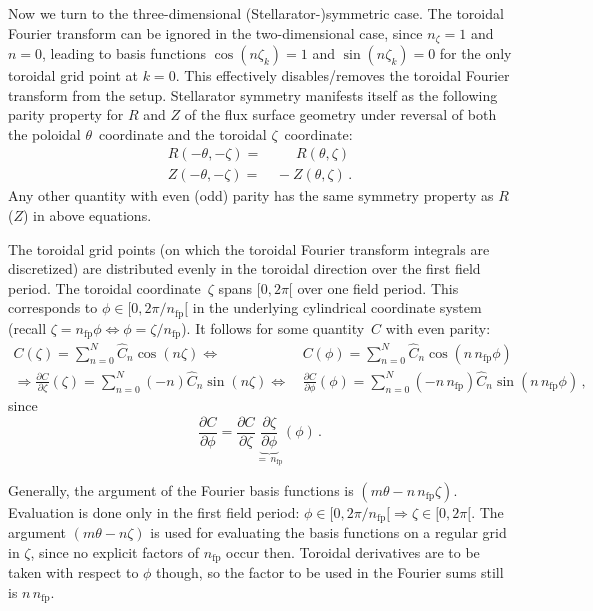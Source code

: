 \FloatBarrier
Now we turn to the three-dimensional (Stellarator-)symmetric case.
The toroidal Fourier transform can be ignored in the two-dimensional case, since $n_\zeta=1$ and $n=0$,
leading to basis functions $\cos(n\zeta_k)=1$ and $\sin(n\zeta_k)=0$ for the only toroidal grid point at $k=0$.
This effectively disables/removes the toroidal Fourier transform from the setup.
Stellarator symmetry manifests itself as the following parity property
for $R$ and $Z$ of the flux surface geometry under reversal
of both the poloidal $\theta$~coordinate and the toroidal $\zeta$~coordinate:
\begin{align}
  R(-\theta, -\zeta) =&\, \phantom{-}~ R(\theta, \zeta) \\
  Z(-\theta, -\zeta) =&\,          -   Z(\theta, \zeta) \, .
\end{align}
Any other quantity with even (odd) parity has the same symmetry property as $R$ ($Z$) in above equations.

The toroidal grid points (on which the toroidal Fourier transform integrals are discretized)
are distributed evenly in the toroidal direction over the first field period.
The toroidal coordinate~$\zeta$ spans $[0,2\pi[$ over one field period.
This corresponds to $\phi \in [0,2\pi/n_\mathrm{fp}[$ in the underlying cylindrical coordinate system
(recall $\zeta = n_\mathrm{fp} \phi \Leftrightarrow \phi = \zeta / n_\mathrm{fp}$).
It follows for some quantity~$C$ with even parity:
\begin{align}
    C(\zeta) = \sum_{n=0}^{N} \hat{C}_n \cos(n \zeta)
  \Leftrightarrow&\,
    C(\phi ) = \sum_{n=0}^{N} \hat{C}_n \cos(n \,n_\mathrm{fp} \phi) \nonumber \\
    \Rightarrow
    \frac{\partial C}{\partial \zeta} (\zeta) = \sum_{n=0}^{N} (-n              ) \hat{C}_n \sin(n               \zeta)
  \Leftrightarrow&\,
    \frac{\partial C}{\partial \phi } (\phi ) = \sum_{n=0}^{N} (-n \,n_\mathrm{fp}) \hat{C}_n \sin(n \,n_\mathrm{fp} \phi ) \, ,
\end{align}
since
\begin{equation}
  \frac{\partial C}{\partial \phi} = \frac{\partial C}{\partial \zeta} \underbrace{\frac{\partial \zeta}{\partial \phi}}_{=\,n_\mathrm{fp}} (\phi) \, .
\end{equation}

Generally, the argument of the Fourier basis functions is $(m \theta - n \,n_\mathrm{fp} \zeta)$.
Evaluation is done only in the first field period: $\phi \in [0,2\pi/n_\mathrm{fp}[ \Rightarrow \zeta \in [0,2\pi[$.
The argument $(m \theta - n \zeta)$ is used for evaluating the basis functions
on a regular grid in $\zeta$, since no explicit factors of $n_\mathrm{fp}$ occur then.
Toroidal derivatives are to be taken with respect to $\phi$ though,
so the factor to be used in the Fourier sums still is $n \,n_\mathrm{fp}$.

